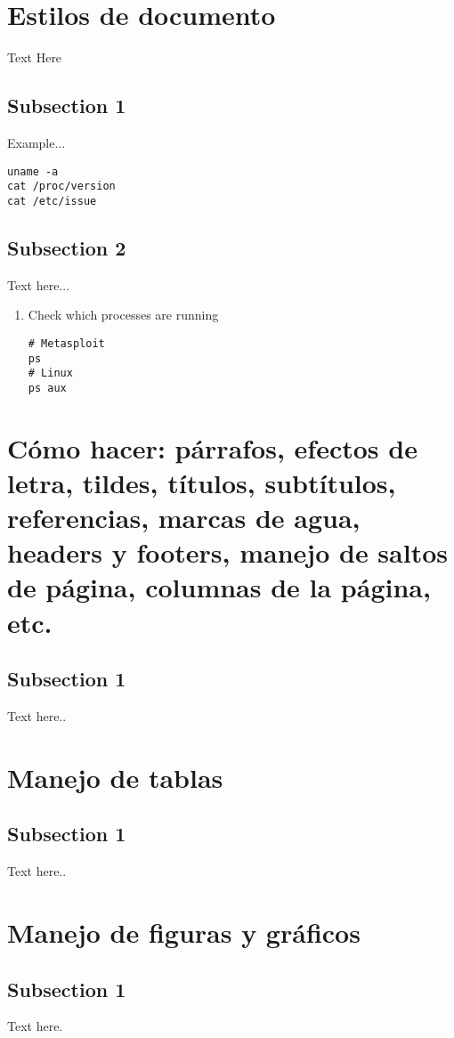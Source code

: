 \documentclass[letterpaper, 10pt, journal]{IEEEtran}
\begin{document}
\section{Estilos de documento}
Text Here
\subsection{Subsection 1}
Example...
\lstset{language=Java}
\begin{lstlisting}
uname -a
cat /proc/version
cat /etc/issue
\end{lstlisting}

\subsection{Subsection 2}
Text here...
\begin{enumerate}
\item Check which processes are running
\lstset{language=Java}
\begin{lstlisting}
# Metasploit
ps
# Linux
ps aux
\end{lstlisting}
\end{enumerate}


\section{C\'omo hacer: p\'arrafos, efectos de letra, tildes, t\'itulos, subt\'itulos, referencias, marcas de agua, headers y footers, manejo de saltos de p\'agina, columnas de la p\'agina, etc.}
\subsection{Subsection 1}
Text here..

\section{Manejo de tablas}
\subsection{Subsection 1}
Text here..

\section{Manejo de figuras y gr\'aficos}
\subsection{Subsection 1}
Text here.
\end{document}
